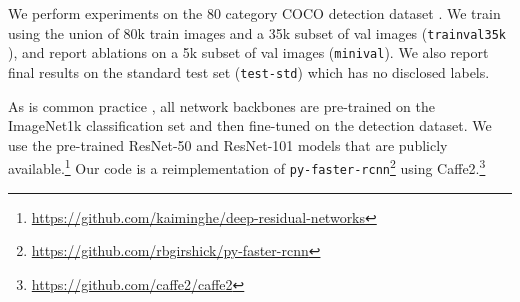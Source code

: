 \documentclass[10pt,twocolumn,letterpaper]{article}
\begin{document}
We perform experiments on the 80 category COCO detection dataset \cite{Lin2014}.
We train using the union of 80k train images and a 35k subset of val images (\texttt{trainval35k} \cite{Bell2016}), and report ablations on a 5k subset of val images (\texttt{minival}).
We also report final results on the standard test set (\texttt{test-std}) \cite{Lin2014} which has no disclosed labels.

As is common practice \cite{Girshick2014}, all network backbones are pre-trained on the ImageNet1k classification set \cite{Russakovsky2015} and then fine-tuned on the detection dataset.
We use the pre-trained ResNet-50 and ResNet-101 models that are publicly available.\footnote{\fontsize{7pt}{1em}\url{https://github.com/kaiminghe/deep-residual-networks}}
Our code is a reimplementation of \texttt{py-faster-rcnn}\footnote{\fontsize{7pt}{1em}\url{https://github.com/rbgirshick/py-faster-rcnn}} using Caffe2.\footnote{\fontsize{7pt}{1em}\url{https://github.com/caffe2/caffe2}}

\newcommand{\pyr}{$\{P_k\}$}
\end{document}
